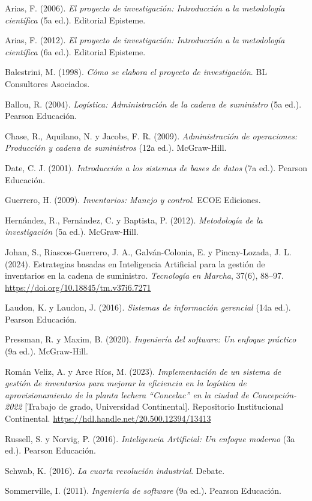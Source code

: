 \documentclass[12pt, letterpaper]{report}
\begin{document}
Arias, F. (2006). \textit{El proyecto de investigación: Introducción
a la metodología científica} (5a ed.). Editorial Episteme.

Arias, F. (2012). \textit{El proyecto de investigación: Introducción
a la metodología científica} (6a ed.). Editorial Episteme.

Balestrini, M. (1998). \textit{Cómo se elabora el proyecto de
investigación}. BL Consultores Asociados.

Ballou, R. (2004). \textit{Logística: Administración de la cadena de
suministro} (5a ed.). Pearson Educación.

Chase, R., Aquilano, N. y Jacobs, F. R. (2009). \textit{Administración
de operaciones: Producción y cadena de suministros} (12a ed.).
McGraw-Hill.

Date, C. J. (2001). \textit{Introducción a los sistemas de bases de
datos} (7a ed.). Pearson Educación.

Guerrero, H. (2009). \textit{Inventarios: Manejo y control}. ECOE
Ediciones.

Hernández, R., Fernández, C. y Baptista, P. (2012). \textit{Metodología
de la investigación} (5a ed.). McGraw-Hill.

Johan, S., Riascos-Guerrero, J. A., Galván-Colonia, E. y
Pincay-Lozada, J. L. (2024). Estrategias basadas en Inteligencia
Artificial para la gestión de inventarios en la cadena de suministro.
\textit{Tecnología en Marcha}, 37(6), 88--97.
\url{https://doi.org/10.18845/tm.v37i6.7271}

Laudon, K. y Laudon, J. (2016). \textit{Sistemas de información
gerencial} (14a ed.). Pearson Educación.

Pressman, R. y Maxim, B. (2020). \textit{Ingeniería del software: Un
enfoque práctico} (9a ed.). McGraw-Hill.

Román Veliz, A. y Arce Ríos, M. (2023). \textit{Implementación de un
sistema de gestión de inventarios para mejorar la eficiencia en la
logística de aprovisionamiento de la planta lechera ``Concelac'' en la
ciudad de Concepción-2022} [Trabajo de grado, Universidad Continental].
Repositorio Institucional Continental.
\url{https://hdl.handle.net/20.500.12394/13413}

Russell, S. y Norvig, P. (2016). \textit{Inteligencia Artificial: Un
enfoque moderno} (3a ed.). Pearson Educación.

Schwab, K. (2016). \textit{La cuarta revolución industrial}. Debate.

Sommerville, I. (2011). \textit{Ingeniería de software} (9a ed.).
Pearson Educación.
\end{document}
